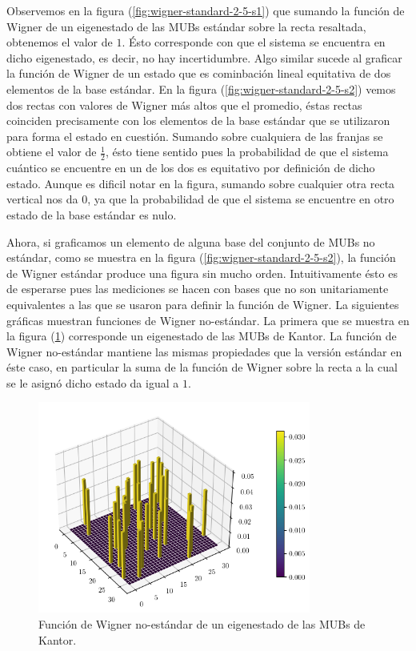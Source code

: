 \documentclass[a4paper]{report}
\begin{document}
  Observemos en la figura (\ref{fig:wigner-standard-2-5-s1})
  que sumando la función de Wigner de un eigenestado de las
  MUBs estándar sobre la recta resaltada, obtenemos el valor
  de $1$. Ésto corresponde con que el sistema se encuentra
  en dicho eigenestado, es decir, no hay incertidumbre. Algo
  similar sucede al graficar la función de Wigner de un
  estado que es cominbación lineal equitativa de dos
  elementos de la base estándar. En la figura
  (\ref{fig:wigner-standard-2-5-s2}) vemos dos rectas con
  valores de Wigner más altos que el promedio, éstas rectas
  coinciden precisamente con los elementos de la base
  estándar que se utilizaron para forma el estado en
  cuestión. Sumando sobre cualquiera de las franjas se
  obtiene el valor de $\frac{1}{2}$, ésto tiene sentido pues
  la probabilidad de que el sistema cuántico se encuentre en
  un de los dos es equitativo por definición de dicho
  estado.  Aunque es dificil notar en la figura, sumando
  sobre cualquier otra recta vertical nos da $0$, ya que la
  probabilidad de que el sistema se encuentre en otro estado
  de la base estándar es nulo.

  Ahora, si graficamos un elemento de alguna base del
  conjunto de MUBs no estándar, como se muestra en la figura
  (\ref{fig:wigner-standard-2-5-s2}), la función de Wigner
  estándar produce una figura sin mucho orden.
  Intuitivamente ésto es de esperarse pues las mediciones se
  hacen con bases que no son unitariamente equivalentes a
  las que se usaron para definir la función de Wigner. La
  siguientes gráficas muestran funciones de Wigner
  no-estándar. La primera que se muestra en la figura
  (\ref{fig:wigner-kantor-2-5-s3}) corresponde un
  eigenestado de las MUBs de Kantor. La función de Wigner
  no-estándar mantiene las mismas propiedades que la versión
  estándar en éste caso, en particular la suma de la función
  de Wigner sobre la recta a la cual se le asignó dicho
  estado da igual a $1$. 

  \begin{figure}[ht]
    \centering
    \includegraphics[width=0.8\textwidth]{imgs/wigner-kantor-2-5-s3.png}
    \caption{Función de Wigner no-estándar de un eigenestado
    de las MUBs de Kantor.}
    \label{fig:wigner-kantor-2-5-s3}
  \end{figure}
\end{document}
